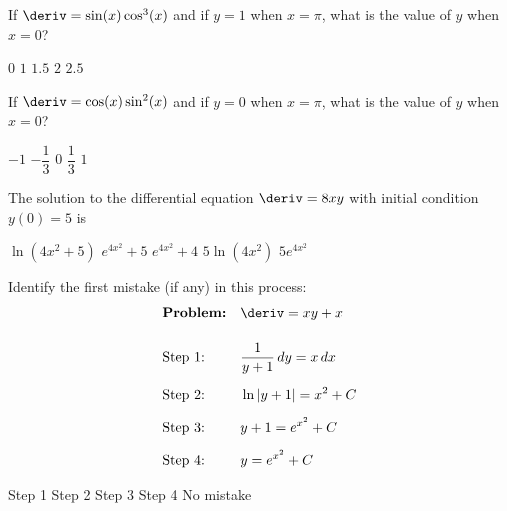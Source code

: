 \begin{questions}
    \question If $\deriv = \sin (x)\cos^3 (x)$ and if $y = 1$ when $x = \pi$, what is the value of $y$ when $x = 0$? \\

    \begin{oneparchoices}
        \choice $0$ 
        \choice $1$
        \choice $1.5$
        \choice $2$
        \choice $2.5$
    \end{oneparchoices} \par \horizontalline

    \question If $\deriv = \cos (x)\sin^2 (x)$ and if $y = 0$ when $x = \pi$, what is the value of $y$ when $x = 0$? \\

    \begin{oneparchoices}
        \choice $-1$ 
        \choice $-\dfrac{1}{3}$
        \choice $0$
        \choice $\dfrac{1}{3}$
        \choice $1$
    \end{oneparchoices} \par \horizontalline

    \question The solution to the differential equation $\deriv = 8xy$ with initial condition $y(0) = 5$ is \\
    
    \begin{oneparchoices}
        \choice $\ln \left(4x^2 + 5\right)$
        \choice $e^{4x^2} + 5$
        \choice $e^{4x^2} + 4$
        \choice $5\ln \left(4x^2\right)$
        \choice $5e^{4x^2}$
    \end{oneparchoices} \par \horizontalline

    \question Identify the first mistake (if any) in this process: \begin{align*}
        & \textbf{Problem:} && \deriv = xy + x \\[11pt]
        & \text{Step 1:} && \dfrac{1}{y + 1} \, dy = x \, dx \\[5.5pt]
        & \text{Step 2:} && \ln |y + 1| = x^2 + C \\[5.5pt]
        & \text{Step 3:} && y + 1 = e^{x^2} + C \\[5.5pt]
        & \text{Step 4:} && y = e^{x^2} + C
    \end{align*}

    \begin{oneparchoices}
        \choice Step 1
        \choice Step 2
        \choice Step 3
        \choice Step 4
        \choice No mistake
    \end{oneparchoices} \par \horizontalline


\end{questions}
